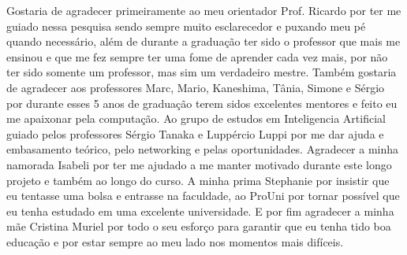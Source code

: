 \begin{agradecimentos}
  Gostaria de agradecer primeiramente ao meu orientador Prof. Ricardo por ter me guiado nessa pesquisa sendo sempre muito esclarecedor e puxando meu pé quando necessário, além de durante a graduação ter sido o professor que mais me ensinou e que me fez sempre ter uma fome de aprender cada vez mais, por não ter sido somente um professor, mas sim um verdadeiro mestre.
  Também gostaria de agradecer aos professores 
  Marc, Mario, Kaneshima, Tânia, Simone e Sérgio 
  por durante esses 5 anos de graduação terem sidos excelentes mentores e feito eu me apaixonar pela computação.
  Ao grupo de estudos em Inteligencia Artificial guiado pelos professores Sérgio Tanaka e Luppércio Luppi por me dar ajuda e embasamento teórico, pelo networking e pelas oportunidades.
  Agradecer a minha namorada Isabeli por ter me ajudado a me manter motivado durante este longo projeto e também ao longo do curso.
  A minha prima Stephanie por insistir que eu tentasse uma bolsa e entrasse na faculdade,
  ao ProUni por tornar possível que eu tenha estudado em uma excelente universidade.
  E por fim agradecer a minha mãe Cristina Muriel por todo o seu esforço para garantir que eu tenha tido boa educação e por estar sempre ao meu lado nos momentos mais difíceis.
\end{agradecimentos}